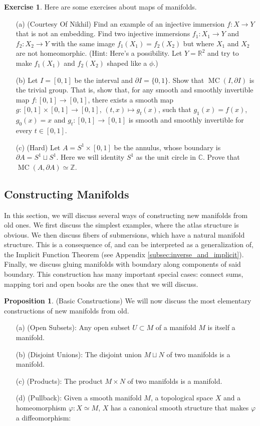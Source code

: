 \documentclass[12pt]{article}
\theoremstyle{definition}
\newtheorem{proposition}[theorem]{Proposition}
\newtheorem{exercise}[theorem]{Exercise}
\numberwithin{equation}{section}
\newcommand{\C}{{\mathbb C}}
\newcommand{\R}{{\mathbb R}}
\newcommand{\Z}{{\mathbb Z}}
\newcommand{\op}{\operatorname}
\begin{document}
\begin{exercise} Here are some exercises about maps of manifolds.
\begin{enumerate}
	\item[(a)] (Courtesy Of Nikhil) Find an example of an injective immersion $f:X \to Y$ that is not an embedding. Find two injective immersions $f_1:X_1 \to Y$ and $f_2:X_2 \to Y$ with the same image $f_1(X_1) = f_2(X_2)$ but where $X_1$ and $X_2$ are not homeomorphic. (Hint: Here's a possibility. Let $Y = \R^2$ and try to make $f_1(X_1)$ and $f_2(X_2)$ shaped like a $\phi$.)
	\item[(b)] Let $I = [0,1]$ be the interval and $\partial I = \{0,1\}$. Show that $\op{MC}(I,\partial I)$ is the trivial group. That is, show that, for any smooth and smoothly invertible map $f:[0,1] \to [0,1]$, there exists a smooth map $g:[0,1] \times [0,1] \to [0,1]$, $(t,x) \mapsto g_t(x)$, such that $g_1(x) = f(x)$, $g_0(x) = x$ and $g_t:[0,1] \to [0,1]$ is smooth and smoothly invertible for every $t \in [0,1]$.  
	\item[(c)] (Hard) Let $A = S^1 \times [0,1]$ be the annulus, whose boundary is $\partial A = S^1 \sqcup S^1$. Here we will identity $S^1$ as the unit circle in $\C$. Prove that $\op{MC}(A,\partial A) \simeq \Z$.
\end{enumerate}
\end{exercise}

\subsection{Constructing Manifolds} In this section, we will discuss several ways of constructing new manifolds from old ones. We first discuss the simplest examples, where the atlas structure is obvious. We then discuss fibers of submersions, which have a natural manifold structure. This is a consequence of, and can be interpreted as a generalization of, the Implicit Function Theorem (see Appendix \ref{subsec:inverse_and_implicit}). Finally, we discuss gluing manifolds with boundary along components of said boundary. This construction has many important special cases: connect sums, mapping tori and open books are the ones that we will discuss.

\begin{proposition} \label{prop:constructions_of_manifolds} (Basic Constructions) We will now discuss the most elementary constructions of new manifolds from old. 
\begin{enumerate} 
	\item[(a)] (Open Subsets): Any open subset $U \subset M$ of a manifold $M$ is itself a manifold. 
	\item[(b)] (Disjoint Unions): The disjoint union $M \sqcup N$ of two manifolds is a manifold.
	\item[(c)] (Products): The product $M \times N$ of two manifolds is a manifold.
	\item[(d)] (Pullback): Given a smooth manifold $M$, a topological space $X$ and a homeomorphism $\varphi:X \simeq M$, $X$ has a canonical smooth structure that makes $\varphi$ a diffeomorphism:
\end{enumerate}
\end{proposition}
\end{document}
